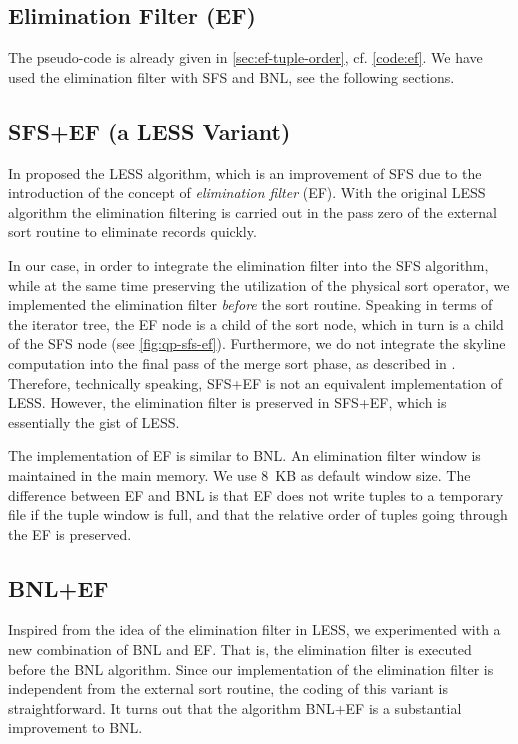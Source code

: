 \subsection{Elimination Filter (EF)}
The pseudo-code is already given in \autoref{sec:ef-tuple-order},
cf. \autoref{code:ef}. We have used the elimination filter with
SFS and BNL, see the following sections.

\subsection{SFS+EF (a LESS Variant)}
In \citep{Godfrey2005}  proposed the LESS
algorithm, which is an improvement of SFS due to the introduction of
the concept of {\em elimination filter} (EF). With the original LESS
algorithm the elimination filtering is carried out in the pass zero of
the external sort routine to eliminate records quickly.

In our case, in order to integrate the elimination filter into the SFS
algorithm, while at the same time preserving the utilization of the
physical sort operator, we implemented the elimination filter {\em
before} the sort routine.  Speaking in terms of the iterator tree, the
EF node is a child of the sort node, which in turn is a child of the
SFS node (see \autoref{fig:qp-sfs-ef}).  Furthermore, we do not
integrate the skyline computation into the final pass of the merge
sort phase, as described in \citep{Godfrey2005}.  Therefore,
technically speaking, SFS+EF is not an equivalent implementation of
LESS.  However, the elimination filter is preserved in SFS+EF, which
is essentially the gist of LESS.

The implementation of EF is similar to BNL.  An elimination filter
window is maintained in the main memory.  We use 8~KB as default
window size.  The difference between EF and BNL is that EF does not
write tuples to a temporary file if the tuple window is full, and that
the relative order of tuples going through the EF is preserved.



\subsection{BNL+EF}
Inspired from the idea of the elimination filter in LESS, we
experimented with a new combination of BNL and EF. That is, the elimination
filter is executed before the BNL algorithm. Since our implementation
of the elimination filter is independent from the external sort
routine, the coding of this variant is straightforward.  It turns out
that the algorithm BNL+EF is a substantial improvement to BNL.



